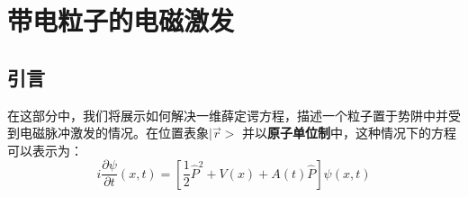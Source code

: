 \documentclass[12pt]{ctexart}
\numberwithin{equation}{section} %
\begin{document}
\section{带电粒子的电磁激发}
\subsection{引言}

在这部分中，我们将展示如何解决一维薛定谔方程，描述一个粒子置于势阱中并受到电磁脉冲激发的情况。在位置表象$|\vec{r}>$ 并以\textbf{原子单位制}中，这种情况下的方程可以表示为：
\begin{equation}
    i\dfrac{\partial\psi}{\partial t}(x,t)=\left[\dfrac{1}{2}\hat{P}^2+V(x)+A(t)\hat{P}\right]\psi(x,t)
   \label{eq:薛定谔方程}
\end{equation}
\end{document}
